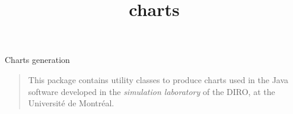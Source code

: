 \begin{titlepage}

\iffalse %

Other potential names:
  
  Simja,  Simjava,  Javasim,  Javarand,  Javaran,  Javas 
  flexim, simflex, SIM-J

 {\sc Pierre L'Ecuyer}  %
\footnote {\normalsize 
  Most of the implementation of SSJ was done by Lakhdar Meliani   
  for his master's thesis.} \\
\medskip
  D\'epartement d'Informatique et de Recherche Op\'erationnelle \\
  Universit\'e de Montr\'eal \
\vfill\vfill
\end {center}

\fi  %

\title{charts}{Charts generation}

\begin {quote}
This package contains utility classes to produce charts
used in the Java software developed in the {\em simulation laboratory\/}
of the DIRO, at the Universit\'e de Montr\'eal.
\end {quote}

\begin {comment}
SSJ (an acronym for {\em Stochastic Simulation in Java\/}) is 
a library of classes, implemented in the Java programming language,
offering general-purpose facilities for simulation programming.
It supports the event view, process view, continuous simulation,
and arbitrary mixtures of these.
\end {comment}

\vfill\vfill

\end{titlepage}
